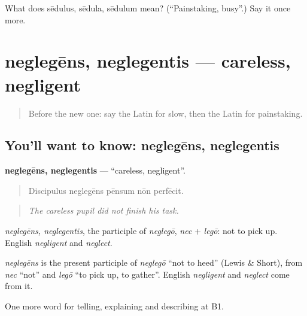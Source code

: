 \begin{tcolorbox}[breakable,colback=teal!4,colframe=teal!35!black,title={Before you move on}]
What does sēdulus, sēdula, sēdulum mean? (\textquotedblleft{}Painstaking, busy\textquotedblright{}.) Say it once more.
\end{tcolorbox}
\section[neglegēns, neglegentis]{neglegēns, neglegentis — careless, negligent}

\label{lesson:LA-C406-neglegens}



\begin{quote}
Before the new one: say the Latin for slow, then the Latin for painstaking.
\end{quote}

\subsection*{You'll want to know: neglegēns, neglegentis}
\textbf{neglegēns, neglegentis} — \textquotedblleft{}careless, negligent\textquotedblright{}.

\begin{quote}
Discipulus neglegēns pēnsum nōn perfēcit.
\end{quote}

\begin{quote}
\emph{The careless pupil did not finish his task.}
\end{quote}

\emph{neglegēns, neglegentis}, the participle of \emph{neglegō}, \emph{nec} + \emph{legō}: not to pick up. English \emph{negligent} and \emph{neglect}.

\begin{cousinweb}
\emph{neglegēns} is the present participle of \emph{neglegō} \textquotedblleft{}not to heed\textquotedblright{} (Lewis \& Short), from \emph{nec} \textquotedblleft{}not\textquotedblright{} and \emph{legō} \textquotedblleft{}to pick up, to gather\textquotedblright{}. English \emph{negligent} and \emph{neglect} come from it.
\end{cousinweb}

\begin{grammarlens}[title={What you've built}]
One more word for telling, explaining and describing at B1.
\end{grammarlens}

